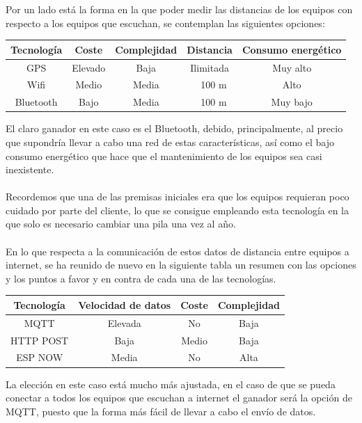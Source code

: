 \documentclass[paper=a4, fontsize=11pt,twoside]{scrartcl}	%
\begin{document}
        Por un lado está la forma en la que poder medir las distancias de los equipos con respecto a los equipos que escuchan,
        se contemplan las siguientes opciones:
        \begin{center}
            \begin{tabular}{|c | c| c| c| c |} 
            \hline
            Tecnología  & Coste  & Complejidad & Distancia & Consumo energético \\ [0.5ex] 
            \hline
            GPS& Elevado& Baja & Ilimitada& Muy alto\\
            Wifi& Medio& Media & ~ 100 m & Alto\\ 
            Bluetooth& Bajo& Media & ~ 100 m & Muy bajo\\ 
            \hline
            \end{tabular}
        \end{center}   
        El claro ganador en este caso es el Bluetooth, debido, principalmente, al precio que supondría llevar a cabo una red de estas 
        características, así como el bajo consumo energético que hace que el mantenimiento de los equipos sea casi inexistente.
        \paragraph{}
        Recordemos que una de las premisas iniciales era que los equipos requieran poco cuidado por parte del cliente, 
        lo que se consigue empleando esta tecnología en la que solo es necesario cambiar una pila una vez al año.
        \paragraph{}
        En lo que respecta a la comunicación de estos datos de distancia entre equipos a internet, se ha reunido de nuevo en la 
        siguiente tabla un resumen con las opciones y los puntos a favor y en contra de cada una de las tecnologías.
        \begin{center}
            \begin{tabular}{||c | c| c| c||} 
            \hline
            Tecnología  & Velocidad de datos & Coste & Complejidad \\ [0.5ex] 
            \hline
            MQTT& Elevada  & No & Baja\\
            HTTP POST& Baja & Medio & Baja\\ 
            ESP NOW& Media & No & Alta\\ 
            \hline
            \end{tabular}
        \end{center}   
        La elección en este caso está mucho más ajustada, en el caso de que se pueda conectar a todos los equipos que 
        escuchan a internet el ganador será la opción de MQTT, puesto que la forma más fácil de llevar a cabo el envío de datos.
\end{document}
